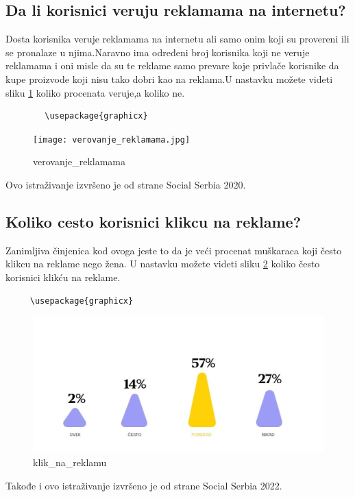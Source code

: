 \documentclass[a4paper]{article}
\begin{document}
{{	\subsection{Da li korisnici veruju reklamama na internetu?}
	\label{subsec:veovanje_reklamama}
	Dosta korisnika veruje reklamama na internetu ali samo onim koji su provereni ili se pronalaze u njima.Naravno ima određeni broj korisnika koji ne veruje reklamama i oni misle da su te reklame samo prevare koje privlače korisnike da kupe proizvode koji nisu tako dobri kao na reklama.U nastavku možete videti sliku \ref{fig:verovanje_reklamama} koliko procenata veruje,a koliko ne.
	\begin{verbatim}
		\usepackage{graphicx}
	\end{verbatim}
	
	\begin{figure}[h!]
		\begin{center}
			\texttt{[image: verovanje\_reklamama.jpg]}
		\end{center}
		\caption{verovanje_reklamama}
		\label{fig:verovanje_reklamama}
	\end{figure}
	Ovo istraživanje izvršeno je od strane Social Serbia 2020.
	\subsection{Koliko cesto korisnici klikcu na reklame?}
	\label{subsec:klik_na_reklamu}
	Zanimljiva činjenica kod ovoga jeste to da je veći procenat muškaraca koji često klikcu na reklame nego žena. U nastavku možete videti sliku \ref{fig:klik_na_reklamu} koliko često korisnici klikću na reklame.
	\begin{verbatim}
	 \usepackage{graphicx}
	\end{verbatim}
	
	\begin{figure}[h!]
		\begin{center}
			\includegraphics[scale=0.55]{klik_na_reklamu.jpg}
		\end{center}
		\caption{klik_na_reklamu}
		\label{fig:klik_na_reklamu}
	\end{figure}
	Takođe i ovo istraživanje izvršeno je od strane Social Serbia 2022.
}}
\end{document}
